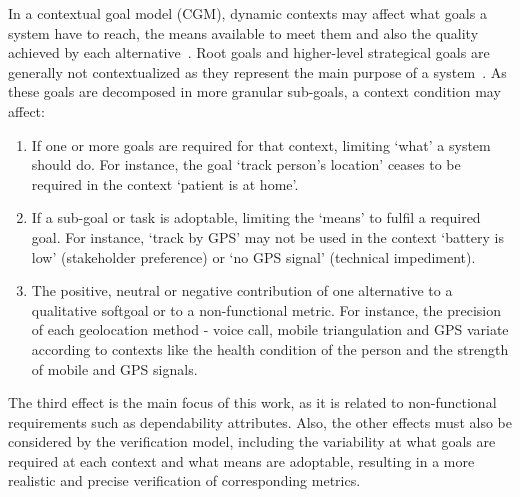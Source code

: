 
In a contextual goal model (CGM), dynamic contexts may affect what goals a system have to reach, the means available to meet them and also the quality achieved by each alternative~\cite{Ali:2010}. Root goals and higher-level strategical goals are generally not contextualized as they represent the main purpose of a system~\cite{Andrea01aframework}. As these goals are decomposed in more granular sub-goals, a context condition may affect:

\begin{enumerate}

\item If one or more goals are required for that context, limiting `what' a system should do. For instance, the goal `track person's location' ceases to be required in the context `patient is at home'.
\medskip

\item If a sub-goal or task is adoptable, limiting the `means' to fulfil a required goal. For instance, `track by GPS' may not be used in the context `battery is low' (stakeholder preference) or `no GPS signal' (technical impediment).
\medskip

\item The positive, neutral or negative contribution of one alternative to a qualitative softgoal or to a non-functional metric. For instance, the precision of each geolocation method - voice call, mobile triangulation and GPS variate according to contexts like the health condition of the person and the strength of mobile and GPS signals.

\end{enumerate}

The third effect is the main focus of this work, as it is related to non-functional requirements such as dependability attributes. Also, the other effects must also be considered by the verification model, including the variability at what goals are required at each context and what means are adoptable, resulting in a more realistic and precise verification of corresponding metrics.


